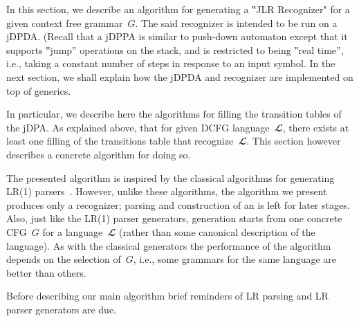 In this section, we describe an algorithm for generating
a ‟JLR Recognizer" for a given context free grammar~$G$.
The said recognizer is intended to be run on a jDPDA.
(Recall that a jDPPA is similar to push-down automaton except that it supports
‟jump” operations on the stack, and is restricted to being ‟real time”, i.e.,
taking a constant number of steps in response
to an input symbol.
In the next section, we shall explain how the jDPDA and
recognizer are implemented on top of \Java generics.

In particular, we describe here the algorithms for filling
the transition tables of the jDPA.
As explained above, that for given DCFG language~$𝓛$,
there exists at least one filling of the transitions table
that recognize~$𝓛$.
This section however describes a concrete algorithm for
doing so.

The presented algorithm is inspired by the classical algorithms for generating
LR(1) parsers~\cite{family1,family2....}.
However, unlike these algorithms, the algorithm we present
produces only a recognizer; parsing and construction of an \AST
is left for later stages.
Also, just like the LR(1) parser generators, generation starts from
one concrete CFG~$G$ for a language~$𝓛$
(rather than some canonical description of the language).
As with the classical generators the performance of the algorithm
depends on the selection of~$G$, i.e., some grammars for the same language
are better than others.

Before describing our main algorithm brief reminders of LR parsing and
LR parser generators are due.
